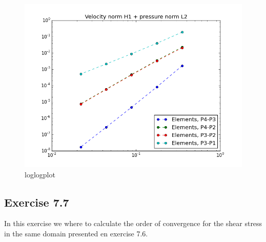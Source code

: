 \documentclass[a4paper,norsk]{article}
\begin{document}
\begin{figure}[h!]
	\centering
	\caption*{loglogplot}
	\includegraphics[scale=0.4]{comb.png}
\end{figure}

\subsection{Exercise 7.7}
In this exercise we where to calculate the order of convergence for the shear stress in the same domain presented en exercise 7.6.
\end{document}
